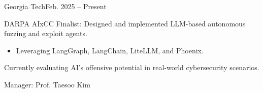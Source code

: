 
\begin{timeitemize}{Georgia Tech}{Feb. 2025 -- Present}
    \item DARPA AIxCC Finalist: Designed and implemented LLM-based autonomous fuzzing and exploit agents.
        \begin{itemize}[label=·]
        \item Leveraging LangGraph, LangChain, LiteLLM, and Phoenix.
        \end{itemize}
    \item Currently evaluating AI's offensive potential in real-world cybersecurity scenarios.
    \item Manager: Prof. Taesoo Kim
\end{timeitemize}

